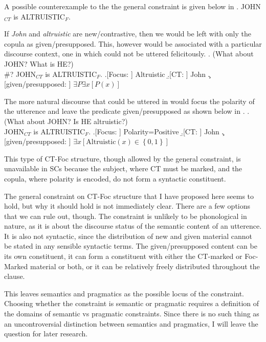 \documentclass[GPFinal]{subfiles}
\begin{document}
A possible counterexample to the the general constraint is given below in \Next
\ex. JOHN$_{CT}$ is ALTRUISTIC$_F$.

If \textit{John} and \textit{altruistic} are new/contrastive, then we would be left with only the copula as given/presupposed.
This, however would be associated with a particular discourse context, one in which \Last could not be uttered felicitously.
\ex. (What about JOHN? What is HE?)\\
\#? JOHN$_{CT}$ is ALTRUISTIC$_F$.
\a.[Focus: ] Altruistic
\b.[CT: ] John
\c.[given/presupposed: ] $\exists P\exists x[P(x)]$

The more natural discourse that \LLast could be uttered in would focus the polarity of the utterence and leave the predicate given/presupposed as shown below in \Next.
\ex. (What about JOHN? Is HE altruistic?)\\
JOHN$_{CT}$ is ALTRUISTIC$_F$.
\a.[Focus: ] Polarity=Positive 
\b.[CT: ] John
\c.[given/presupposed: ] $\exists x[\text{Altruistic}(x) \in \left\{ 0,1 \right\}]$

This type of CT-Foc structure, though allowed by the general constraint, is unavailable in SCs because the subject, where CT must be marked, and the copula, where polarity is encoded, do not form a syntactic constituent.

The general constraint on CT-Foc structure that I have proposed here seems to hold, but why it should hold is not immediately clear.
There are a few options that we can rule out, though.
The constraint is unlikely to be phonological in nature, as it is about the discourse status of the semantic content of an utterence.
It is also not syntactic, since the distribution of new and given material cannot be stated in any sensible syntactic terms.
The given/presupposed content can be its own constituent, it can form a constituent with either the CT-marked or Foc-Marked material or both, or it can be relatively freely distributed throughout the clause.

This leaves semantics and pragmatics as the possible locus of the constraint.
Choosing whether the constraint is semantic or pragmatic requires a definition of the domains of semantic vs pragmatic constraints.
Since there is no such thing as an uncontroversial distinction between semantics and pragmatics, I will leave the question for later research.
\end{document}
